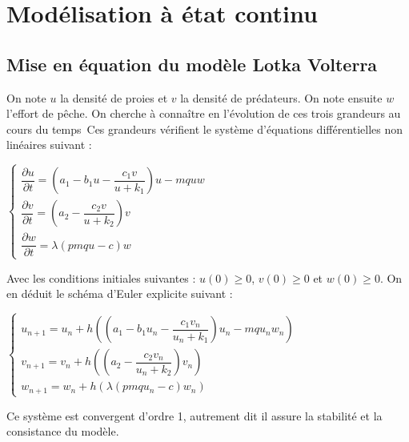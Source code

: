 \documentclass[a4paper, 11pt]{report}%
\begin{document}
    \section{Modélisation à état continu}
        \subsection{Mise en équation du modèle Lotka Volterra}
        On note $u$ la densité de proies et $v$ la densité de prédateurs. On note ensuite $w$ l'effort de pêche. On cherche à connaître en l'évolution de ces trois grandeurs au cours du temps\
        Ces grandeurs vérifient le système d'équations différentielles non linéaires suivant : 
        \begin{center}
        $ \left\{
            \begin{array}{ll}
                \dfrac{\partial u}{ \partial t} = \left( a_1 - b_1 u - \dfrac{c_1 v}{u+ k_1}  \right) u - mquw \\
                \dfrac{\partial v}{ \partial t} = \left( a_2 - \dfrac{c_2 v}{u+ k_2} \right) v \\
                \dfrac{\partial w}{ \partial t} = \lambda \left( pmqu - c \right) w
            \end{array}
        \right.$
        \end{center}
        Avec les conditions initiales suivantes :  $u(0) \geq 0$, $v(0) \geq 0$ et $w(0) \geq 0$.
        On en déduit le schéma d'Euler explicite suivant : 
        \begin{center}
        $ \left\{
            \begin{array}{ll}
                u_{n+1} = u_n + h \left( \left( a_1 - b_1 u_n - \dfrac{c_1 v_n}{u_n + k_1}  \right) u_n - mqu_n w_n \right)\\
                v_{n+1} = v_n + h \left( \left( a_2 - \dfrac{c_2 v_n}{u_n + k_2} \right) v_n \right) \\
                w_{n+1} = w_n + h \left( \lambda \left( pmq u_n - c \right) w_n \right)
            \end{array}
        \right.$
        \end{center}
        Ce système est convergent d'ordre 1, autrement dit il assure la stabilité et la consistance du modèle.

\end{document}
